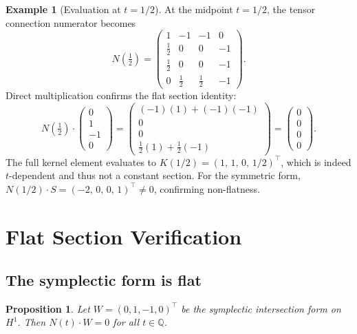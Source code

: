 \documentclass[11pt]{article}
\theoremstyle{plain}
\newtheorem{proposition}[theorem]{Proposition}
\theoremstyle{definition}
\newtheorem{example}[theorem]{Example}
\theoremstyle{remark}
\newcommand{\Q}{\mathbb{Q}}
\begin{document}
\begin{example}[Evaluation at $t = 1/2$]\label{ex:eval}
At the midpoint $t = 1/2$, the tensor connection numerator becomes
\[
N\!\left(\tfrac{1}{2}\right) =
\begin{pmatrix}
1 & -1 & -1 & 0 \\
\frac{1}{2} & 0 & 0 & -1 \\[2pt]
\frac{1}{2} & 0 & 0 & -1 \\[2pt]
0 & \frac{1}{2} & \frac{1}{2} & -1
\end{pmatrix}.
\]
Direct multiplication confirms the flat section identity:
\[
N\!\left(\tfrac{1}{2}\right) \cdot
\begin{pmatrix} 0 \\ 1 \\ -1 \\ 0 \end{pmatrix}
=
\begin{pmatrix} (-1)(1) + (-1)(-1) \\ 0 \\ 0 \\
\frac{1}{2}(1) + \frac{1}{2}(-1) \end{pmatrix}
=
\begin{pmatrix} 0 \\ 0 \\ 0 \\ 0 \end{pmatrix}.
\]
The full kernel element evaluates to
$K(1/2) = (1,\, 1,\, 0,\, 1/2)^{\!\top}$, which is indeed
$t$-dependent and thus not a constant section.
For the symmetric form,
$N(1/2) \cdot S = (-2,\, 0,\, 0,\, 1)^{\!\top} \neq 0$,
confirming non-flatness.
\end{example}

\section{Flat Section Verification}\label{sec:flat}

\subsection{The symplectic form is flat}

\begin{proposition}\label{prop:flat-W}
Let $W = (0, 1, -1, 0)^{\!\top}$ be the symplectic
intersection form on~$H^1$.  Then $N(t) \cdot W = 0$
for all $t \in \Q$.
\end{proposition}
\end{document}
